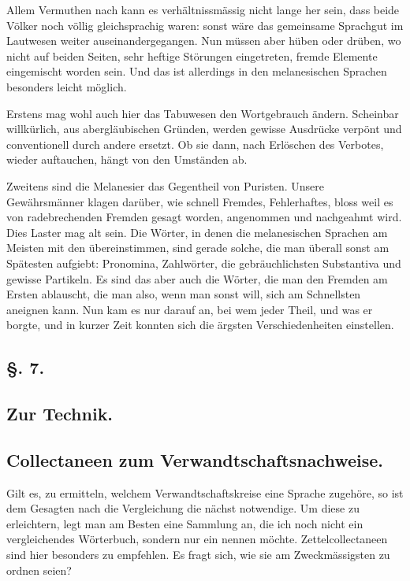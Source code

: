 \begin{sloppypar}Allem Vermuthen nach kann es verhältnissmässig nicht lange her sein, dass beide Völker noch völlig gleichsprachig waren: sonst wäre das gemeinsame Sprachgut im Lautwesen weiter auseinandergegangen. Nun müssen aber hüben oder drüben, wo nicht auf beiden Seiten, sehr heftige Störungen eingetreten, fremde Elemente eingemischt worden sein. Und das ist allerdings in den melanesischen Sprachen besonders leicht möglich.\end{sloppypar}

\label{sp.166}

Erstens mag wohl auch hier das Tabuwesen den Wortgebrauch ändern. Scheinbar willkürlich, aus abergläubischen Gründen, werden gewisse Ausdrücke verpönt und conventionell durch andere ersetzt. Ob sie dann, nach Erlöschen des Verbotes, wieder auftauchen, hängt von den Umständen ab.

Zweitens sind die Melanesier das Gegentheil von Puristen. Unsere Gewährsmänner klagen darüber, wie schnell Fremdes, Fehlerhaftes, bloss weil es von radebrechenden Fremden gesagt worden, angenommen und \label{fp.177} nachgeahmt wird. Dies Laster mag alt sein. Die Wörter, in denen die melanesischen Sprachen am Meisten mit den  übereinstimmen, sind gerade solche, die man überall sonst am Spätesten aufgiebt: Pronomina, Zahlwörter, die gebräuchlichsten Substantiva und gewisse Partikeln. Es sind das aber auch die Wörter, die man den Fremden am Ersten ablauscht, die man also, wenn man sonst will, sich am Schnellsten aneignen kann. Nun kam es nur darauf an, bei wem jeder Theil, und was er borgte, und in kurzer Zeit konnten sich die ärgsten Verschiedenheiten einstellen.

\subsection*{§. 7.}\label{III.I.I.7}
\subsection*{Zur Technik.}
\subsection*{Collectaneen zum Verwandtschaftsnachweise.}
Gilt es, zu ermitteln, welchem Verwandtschaftskreise eine Sprache zugehöre, so ist dem Gesagten nach die  Vergleichung die nächst notwendige. Um diese zu erleichtern, legt man am Besten eine Sammlung an, die ich noch nicht ein vergleichendes Wörterbuch, sondern nur ein  nennen möchte. Zettelcollectaneen sind hier besonders zu empfehlen. Es fragt sich, wie sie am Zweckmässigsten zu ordnen seien?

